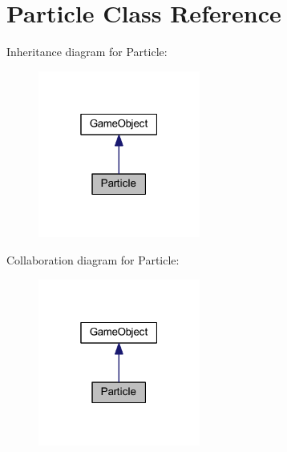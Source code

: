 \hypertarget{class_particle}{\section{Particle Class Reference}
\label{class_particle}
}


Inheritance diagram for Particle\+:\nopagebreak
\begin{figure}[H]
\begin{center}
\leavevmode
\includegraphics[width=151pt]{class_particle__inherit__graph}
\end{center}
\end{figure}


Collaboration diagram for Particle\+:\nopagebreak
\begin{figure}[H]
\begin{center}
\leavevmode
\includegraphics[width=151pt]{class_particle__coll__graph}
\end{center}
\end{figure}
